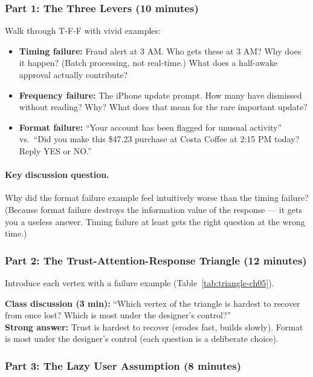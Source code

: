 \subsubsection{Part 1: The Three Levers (10 minutes)}

Walk through T-F-F with vivid examples:
\begin{itemize}
    \item \textbf{Timing failure:} Fraud alert at 3 AM. Who gets these at 3 AM? Why does it happen? (Batch processing, not real-time.) What does a half-awake approval actually contribute?
    \item \textbf{Frequency failure:} The iPhone update prompt. How many have dismissed without reading? Why? What does that mean for the rare important update?
    \item \textbf{Format failure:} ``Your account has been flagged for unusual activity'' vs.\ ``Did you make this \$47.23 purchase at Costa Coffee at 2:15 PM today? Reply YES or NO.''
\end{itemize}

\paragraph{Key discussion question.} Why did the format failure example feel intuitively worse than the timing failure? (Because format failure destroys the information value of the response --- it gets you a useless answer. Timing failure at least gets the right question at the wrong time.)

\subsubsection{Part 2: The Trust-Attention-Response Triangle (12 minutes)}

Introduce each vertex with a failure example (Table~\ref{tab:triangle-ch05}).

\begin{trythis}
\textbf{Class discussion (3 min):} ``Which vertex of the triangle is hardest to recover from once lost? Which is most under the designer's control?''\\[0.5em]
\textbf{Strong answer:} Trust is hardest to recover (erodes fast, builds slowly). Format is most under the designer's control (each question is a deliberate choice).
\end{trythis}

\subsubsection{Part 3: The Lazy User Assumption (8 minutes)}

